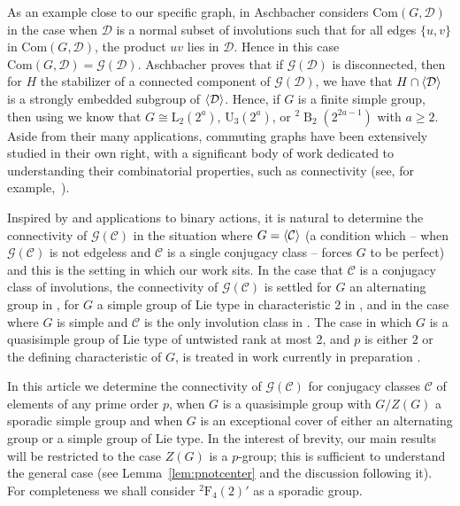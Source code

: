 \documentclass[11pt,a4paper]{amsart}
\theoremstyle{plain}
\theoremstyle{definition}
\theoremstyle{remark}
\theoremstyle{remark}
\theoremstyle{remark}
\theoremstyle{definition}
\newcommand{\twist}[1]{%
  {}^{2}\!#1%
}
\newcommand{\GG}{\mathcal{G}}
\DeclareMathOperator{\B}{B}
\DeclarePairedDelimiter{\gen}{\langle}{\rangle}
\begin{document}
As an example close to our specific graph, in \cite[Theorem 1]{AschbacherExistence} Aschbacher considers $\mathrm{Com}(G,\mathcal D)$ in the case when $\mathcal D$ is a normal subset of involutions such that for all edges $\{u,v\}$ in $\mathrm{Com}(G,\mathcal D)$, the product $uv$ lies in $\mathcal D$. Hence in this case $\mathrm{Com}(G,\mathcal D)=\GG(\mathcal D)$.
Aschbacher proves that if $\GG(\mathcal D)$ is disconnected, then for $H$ the stabilizer of a connected component of $\GG(\mathcal D)$, we have that $H \cap \gen{\mathcal D}$ is a strongly embedded subgroup of $\gen{\mathcal D}$. Hence, if $G$ is a finite simple group, then using \cite[Satz 4]{Bender} we know that $G \cong \mathrm{L}_2(2^a)$, $\mathrm{U}_3(2^a)$, or $\twist\B_2(2^{2a-1})$ with $a\ge 2$. Aside from their many applications, commuting graphs have been extensively studied in their own right, with a significant body of work dedicated to understanding their combinatorial properties, such as connectivity (see, for example,~\cite{BBHR07,IranJafar08,MorPar13}).

Inspired by \cite{AschbacherExistence} and applications to binary actions, it is natural to determine the connectivity of $\GG(\mathcal C)$ in the situation where $G=\gen{\mathcal C}$ (a condition which -- when $\GG(\mathcal{C})$ is not edgeless and $\mathcal C$ is a single conjugacy class -- forces $G$ to be perfect) and this is the setting in which our work sits. In the case that $\mathcal C$ is a conjugacy class of involutions, the connectivity of $\GG(\mathcal C)$ is settled for $G$ an alternating group in \cite[Proposition 3.4]{GG25}, for $G$ a simple group of Lie type in characteristic $2$ in \cite[Theorem 2]{GGL25}, and in the case where $G$ is simple and $\mathcal C$ is the only involution class in \cite[Proposition 3.1]{GG252}. The case in which $G$ is a quasisimple group of Lie type of untwisted rank at most 2, and $p$ is either $2$ or the defining characteristic of $G$, is treated in work currently in preparation \cite{dVGL26}.

In this article we determine the connectivity of $\GG(\mathcal C)$ for conjugacy classes $\mathcal C$ of elements of any prime order $p$, when $G$ is a quasisimple group with $G/Z(G)$ a sporadic simple group and when $G$ is an exceptional cover of either an alternating group or a simple group of Lie type. In the interest of brevity, our main results will be restricted to the case $Z(G)$ is a $p$-group; this is sufficient to understand the general case (see Lemma~\ref{lem:pnotcenter} and the discussion following it). For completeness we shall consider ${}^2\mathrm{F}_4(2)'$ as a sporadic group.
\end{document}
